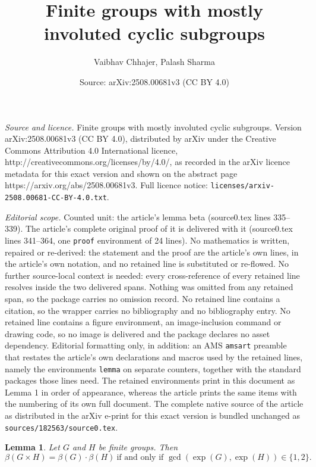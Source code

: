 \documentclass[10pt,a4paper]{amsart}
\title{Finite groups with mostly involuted cyclic subgroups}
\author{Vaibhav Chhajer, Palash Sharma}
\date{Source: arXiv:2508.00681v3 (CC BY 4.0)}
\newtheorem{lemma}{Lemma}
\begin{document}
\maketitle

\noindent\emph{Source and licence.} Finite groups with mostly involuted cyclic subgroups. Version arXiv:2508.00681v3 (CC BY 4.0), distributed by arXiv under the Creative Commons Attribution 4.0 International licence, http://creativecommons.org/licenses/by/4.0/, as recorded in the arXiv licence metadata for this exact version and shown on the abstract page https://arxiv.org/abs/2508.00681v3. Full licence notice: \texttt{licenses/arxiv-2508.00681-CC-BY-4.0.txt}.\par\smallskip

\noindent\textit{Editorial scope.} Counted unit: the article's lemma beta (source0.tex lines 335--339). The article's complete original proof of it is delivered with it (source0.tex lines 341--364, one \texttt{proof} environment of 24 lines). No mathematics is written, repaired or re-derived: the statement and the proof are the article's own lines, in the article's own notation, and no retained line is substituted or re-flowed.  No further source-local context is needed: every cross-reference of every retained line resolves inside the two delivered spans.  Nothing was omitted from any retained span, so the package carries no omission record.  No retained line contains a citation, so the wrapper carries no bibliography and no bibliography entry.  No retained line contains a figure environment, an image-inclusion command or drawing code, so no image is delivered and the package declares no asset dependency.  Editorial formatting only, in addition: an AMS \texttt{amsart} preamble that restates the article's own declarations and macros used by the retained lines, namely the environments \texttt{lemma} on separate counters, together with the standard packages those lines need.  The retained environments print in this document as Lemma 1 in order of appearance, whereas the article prints the same items with the numbering of its own full document.  The complete native source of the article as distributed in the arXiv e-print for this exact version is bundled unchanged as \texttt{sources/182563/source0.tex}.
\begin{lemma} \label{basic property of beta}
    Let $G$ and $H$ be finite groups. Then 
    $$\beta(G\times H)=\beta(G)\cdot\beta(H)\ 
    \text{if and only if } \operatorname{gcd}(\operatorname{exp}(G),\operatorname{exp}(H)) \in \{1,2\}.$$
\end{lemma}
\end{document}
